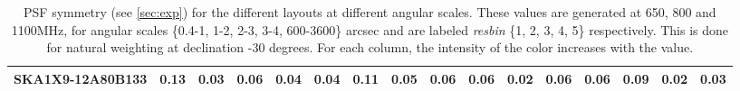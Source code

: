 \begin{table}[htp]
{{\begin{tabular}{|lccccc||ccccc||ccccc|}
SKA1X9-12A80B133 & 0.13 \cellcolor{blue!18.00} & 0.03 \cellcolor{red!23.25} & 0.06 \cellcolor{green!39.00} & 0.04 \cellcolor{orange!18.00} & 0.04 \cellcolor{purple!60.00} & 0.11 \cellcolor{blue!28.50} & 0.05 \cellcolor{red!39.00} & 0.06 \cellcolor{green!18.00} & 0.06 \cellcolor{orange!28.50} & 0.02 \cellcolor{purple!18.00} & 0.06 \cellcolor{blue!18.00} & 0.06 \cellcolor{red!32.00} & 0.09 \cellcolor{green!60.00} & 0.02 \cellcolor{orange!18.00} & 0.03 \cellcolor{purple!18.00}\\ \hline 
\end{tabular}}
\vspace{-0.300000cm}
\hfill
\caption{PSF symmetry (see \autoref{sec:exp}) for the different layouts at different angular scales. These values are generated at
650, 800 and 1100MHz, for angular scales \{0.4-1, 1-2, 2-3, 3-4, 600-3600\} arcsec and are labeled {\it resbin} \{1, 2, 3, 4, 5\}
respectively. This is done for natural weighting at declination -30 degrees. For each column, the intensity of the
color increases with the value.}\label{tab:psf_sym}}
 \end{table}
